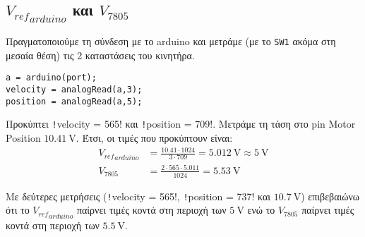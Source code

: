 \subsection{${V_{ref}}_{arduino}$ και $V_{7805}$}
Πραγματοποιούμε τη σύνδεση με το arduino και μετράμε (με το \texttt{SW1} ακόμα στη μεσαία θέση) τις 2 καταστάσεις του κινητήρα.
\begin{code}
\begin{verbatim}
a = arduino(port);
velocity = analogRead(a,3);
position = analogRead(a,5);
\end{verbatim}
\end{code}
Προκύπτει \texttt!velocity = 565! και \texttt!position = 709!.
Μετράμε τη τάση στο pin Motor Position $\SI{10.41}{\volt}$.
Έτσι, οι τιμές που προκύπτουν είναι:
\begin{align*}
{V_{ref}}_{arduino} &= \frac{10.41 \cdot{} 1024}{3 \cdot{} 709} = \SI{5.012}{\volt} \approx \SI{5}{\volt}\\
V_{7805} &= \frac{2 \cdot{} 565 \cdot{} 5.011}{1024} = \SI{5.53}{\volt}
\end{align*}

Με δεύτερες μετρήσεις
(\texttt!velocity = 565!, \texttt!position = 737! και $\SI{10.7}{\volt}$)
επιβεβαιώνω ότι το ${V_{ref}}_{arduino}$ παίρνει τιμές κοντά στη περιοχή των $\SI{5}{\volt}$ ενώ το $V_{7805}$ παίρνει τιμές κοντά στη περιοχή των $\SI{5.5}{\volt}$.
